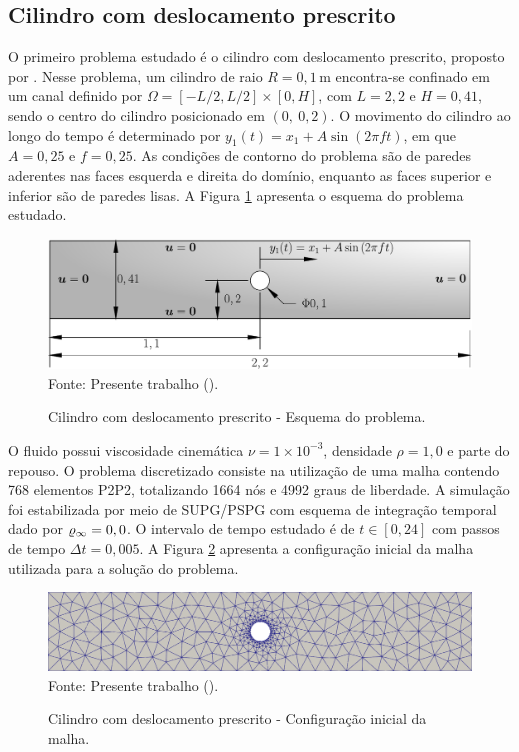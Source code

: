 \subsection{Cilindro com deslocamento prescrito}

O primeiro problema estudado é o cilindro com deslocamento prescrito, proposto por . Nesse problema, um cilindro de raio $R=0,1\,\mathrm{m}$ encontra-se confinado em um canal definido por $\Omega=[-L/2, L/2]\times[0,H]$, com $L=2,2$ e $H=0,41$, sendo o centro do cilindro posicionado em $(0,\ 0,2)$. O movimento do cilindro ao longo do tempo é determinado por $y_1(t)=x_1+A\sin{(2\pi f t)}$, em que $A=0,25$ e $f=0,25$. As condições de contorno do problema são de paredes aderentes nas faces esquerda e direita do domínio, enquanto as faces superior e inferior são de paredes lisas. A Figura \ref{fig:moving-cylinder} apresenta o esquema do problema estudado.

\begin{figure}[h!]
    \centering
    \caption{Cilindro com deslocamento prescrito - Esquema do problema.}
    \includegraphics[width=.7\linewidth]{Figuras/moving-cylinder/moving-cilinder.pdf}
    \\Fonte: Presente trabalho (\the\year).
    \label{fig:moving-cylinder}
\end{figure}

O fluido possui viscosidade cinemática $\nu=1\times10^{-3}$, densidade $\rho=1,0$ e parte do repouso. O problema discretizado consiste na utilização de uma malha contendo 768 elementos P2P2, totalizando 1664 nós e 4992 graus de liberdade. A simulação foi estabilizada por meio de SUPG/PSPG com esquema de integração temporal dado por $\varrho_\infty=0,0$. O intervalo de tempo estudado é de $t\in[0,24]$ com passos de tempo $\Delta t=0,005$. A Figura \ref{fig:moving-cylinder-mesh} apresenta a configuração inicial da malha utilizada para a solução do problema.

\begin{figure}[h!]
    \centering
    \caption{Cilindro com deslocamento prescrito - Configuração inicial da malha.}
    \includegraphics[width=\linewidth]{Figuras/moving-cylinder/mesh1.png}
    \\Fonte: Presente trabalho (\the\year).
    \label{fig:moving-cylinder-mesh}
\end{figure}

